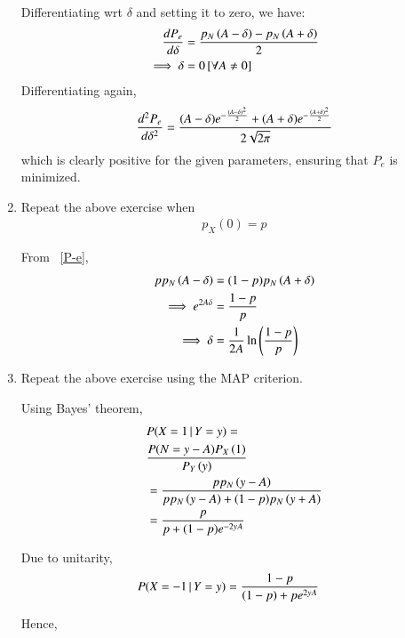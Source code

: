 \documentclass[journal,12pt,twocolumn]{IEEEtran}
\DeclareMathOperator*{\pipe}{|}
\renewcommand\thesection{\arabic{section}}
\providecommand{\sbrak}[1]{\ensuremath{{}\left[#1\right]}}
\providecommand{\brak}[1]{\ensuremath{\left(#1\right)}}
\theoremstyle{remark}
\numberwithin{equation}{section}
\numberwithin{equation}{section}
\begin{document}
\begin{enumerate}[label=\thesection.\arabic*, ref=\thesection.\theenumi]
Differentiating wrt $\delta$ and setting it to zero, we have:
\begin{align}
    \oder{P_e}{\delta} &= \frac{\pdf{A - \delta}{N} - \pdf{A + \delta}{N}}{2}\nonumber \\
    \implies \delta &= 0 \sbrak{\forall A \neq 0}
\end{align}
Differentiating again,
\begin{align}
    \frac{d^2 P_e}{d \delta^2} = \frac{(A - \delta)e^{-\frac{(A - \delta)^2}{2}} + (A + \delta)e^{-\frac{(A + \delta)^2}{2}}}{2\sqrt{2 \pi}}
\end{align}
which is clearly positive for the given parameters, ensuring that $P_e$ is minimized.

\item Repeat the above exercise when 
	\begin{align}
		p_{X}(0) = p
	\end{align}

    From ~\eqref{P-e},
    \begin{align}
        p \pdf{A - \delta}{N} &= (1 - p) \pdf{A + \delta}{N} \nonumber \\
        \implies \e{2A \delta} &= \frac{1 - p}{p} \nonumber \\
        \implies \delta &= \frac{1}{2A} \ln\brak{\frac{1 - p}{p}}
    \end{align}


    \item Repeat the above exercise using the MAP criterion.

    Using Bayes' theorem,
        \begin{align}
            &P(X = 1 \pipe Y = y) = \nonumber \\
            &\frac{P(N = y - A)\cdf{1}{X}}{\cdf{y}{Y}} \nonumber \\
            &= \frac{p\pdf{y - A}{N}}{p\pdf{y - A}{N} + (1 - p)\pdf{y + A}{N}} \nonumber \\
            &= \frac{p}{p + (1 - p)\e{-2yA}}
        \end{align}

    Due to unitarity,
        \begin{align}
            P(X = -1 \pipe Y = y) &= \frac{1 - p}{(1 - p) + p\e{2yA}}
        \end{align}

    Hence, 


\end{enumerate}
\end{document}
